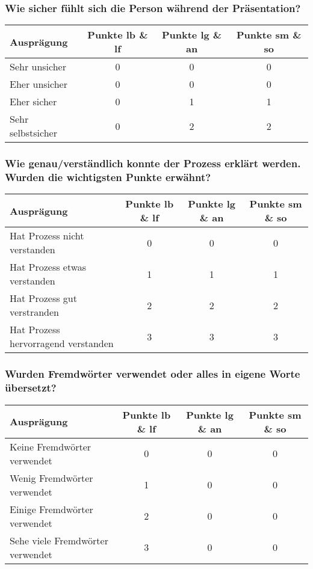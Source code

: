 \subsubsection{Wie sicher fühlt sich die Person während der Präsentation?}
\begin{tabular}{| l | c | c | c |}
  \hline	
  \textbf{Ausprägung} & \textbf{Punkte lb \& lf} & \textbf{Punkte lg \& an} & \textbf{Punkte sm \& so} \\
  \hline  		
  Sehr unsicher & 0  & 0 & 0 \\ 
  \hline
  Eher unsicher & 0 & 0 & 0 \\ 
  \hline
  Eher sicher & 0 & 1 & 1 \\
  \hline  
  Sehr selbstsicher & 0 & 2 &  2 \\
  \hline  
\end{tabular}

\subsubsection{Wie genau/verständlich konnte der Prozess erklärt werden. Wurden die wichtigsten Punkte erwähnt?}
\begin{tabular}{| l | c | c | c |}
  \hline	
  \textbf{Ausprägung} & \textbf{Punkte lb \& lf} & \textbf{Punkte lg \& an} & \textbf{Punkte sm \& so} \\
  \hline  		
  Hat Prozess nicht verstanden & 0  & 0 & 0 \\ 
  \hline
  Hat Prozess etwas verstanden & 1 & 1 & 1 \\ 
  \hline
  Hat Prozess gut verstranden & 2 & 2 & 2 \\
  \hline  
  Hat Prozess hervorragend verstanden & 3 & 3 &  3 \\
  \hline  
\end{tabular}

\subsubsection{Wurden Fremdwörter verwendet oder alles in eigene Worte übersetzt?}
\begin{tabular}{| l | c | c | c |}
  \hline	
  \textbf{Ausprägung} & \textbf{Punkte lb \& lf} & \textbf{Punkte lg \& an} & \textbf{Punkte sm \& so} \\
  \hline  		
  Keine Fremdwörter verwendet & 0  & 0 & 0 \\ 
  \hline
  Wenig Fremdwörter verwendet & 1 & 0 & 0 \\ 
  \hline
  Einige Fremdwörter verwendet & 2 & 0 & 0 \\
  \hline  
  Sehe viele Fremdwörter verwendet & 3 & 0 &  0 \\
  \hline  
\end{tabular}


